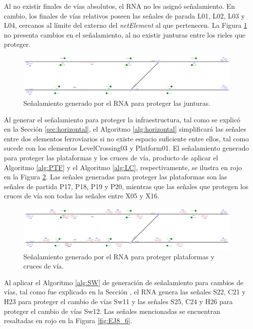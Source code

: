 	Al no existir finales de vías absolutos, el RNA no les asignó señalamiento. En cambio, los finales de vías relativos poseen las señales de parada L01, L02, L03 y L04, cercanos al límite del externo del \textit{netElement} al que pertenecen.  La Figura \ref{fig:EJ8_4} no presenta cambios en el señalamiento, al no existir junturas entre los rieles que proteger.
	
	\begin{figure}[H]
		\centering
		\includegraphics[width=1\textwidth]{resultados-obtenidos/ejemplo8/images/8_step2.png}
		\centering\caption{Señalamiento generado por el RNA para proteger las junturas.}
		\label{fig:EJ8_4}
	\end{figure}
	
	Al generar el señalamiento para proteger la infraestructura, tal como se explicó en la Sección \ref{sec:horizontal}, el Algoritmo \ref{alg:horizontal} simplificará las señales entre dos elementos ferroviarios si no existe espacio suficiente entre ellos, tal como sucede con los elementos LevelCrossing03 y Platform01. El señalamiento generado para proteger las plataformas y los cruces de vía, producto de aplicar el Algoritmo \ref{alg:PTF} y el Algoritmo \ref{alg:LC}, respectivamente, se ilustra en rojo en la Figura \ref{fig:EJ8_5}. Las señales generadas para proteger las plataformas son las señales de partida P17, P18, P19 y P20, mientras que las señales que protegen los cruces de vía son todas las señales entre X05 y X16.
	
	\begin{figure}[H]
		\centering
		\includegraphics[width=1\textwidth]{resultados-obtenidos/ejemplo8/images/8_step3.png}
		\centering\caption{Señalamiento generado por el RNA para proteger plataformas y cruces de vía.}
		\label{fig:EJ8_5}
	\end{figure}
	
	Al aplicar el Algoritmo \ref{alg:SW} de generación de señalamiento para cambios de vías, tal como fue explicado en la Sección \label{sec:signal_switches}, el RNA genera las señales S22, C21 y H23 para proteger el cambio de vías Sw11 y las señales S25, C24 y H26 para proteger el cambio de vías Sw12. Las señales mencionadas se encuentran resaltadas en rojo en la Figura \ref{fig:EJ8_6}.
	
